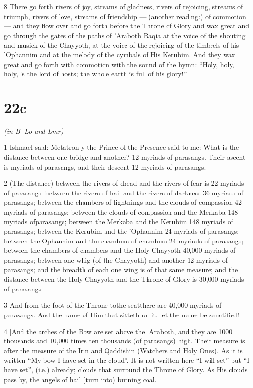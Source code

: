 \par 8 There go forth rivers of joy, streams of gladness, rivers of rejoicing, streams of triumph, rivers of love, streams of friendship — (another reading:) of commotion — and they flow over and go forth before the Throne of Glory and wax great and go through the gates of the paths of 'Araboth Raqia at the voice of the shouting and musick of the Chayyoth, at the voice of the rejoicing of the timbrels of his 'Ophannim and at the melody of the cymbals of His Kerubim. And they wax great and go forth with commotion with the sound of the hymn: “Holy, holy, holy, is the lord of hosts; the whole earth is full of his glory!”

\chapter{22c}

\par \textit{(in B, Lo and Lmr)}

\par 1 Ishmael said: Metatron y the Prince of the Presence said to me: What is the distance between one bridge and another? 12 myriads of parasangs. Their ascent is myriads of parasangs, and their descent 12 myriads of parasangs.

\par 2 (The distance) between the rivers of dread and the rivers of fear is 22 myriads of parasangs; between the rivers of hail and the rivers of darkness 36 myriads of parasangs; between the chambers of lightnings and the clouds of compassion 42 myriads of parasangs; between the clouds of compassion and the Merkaba 148 myriads ofparasangs; between the Merkaba and the Kerubim 148 myriads of parasangs; between the Kerubim and the 'Ophannim 24 myriads of parasangs; between the Ophannim and the chambers of chambers 24 myriads of parasangs; between the chambers of chambers and the Holy Chayyoth 40,000 myriads of parasangs; between one whig (of the Chayyoth) and another 12 myriads of parasangs; and the breadth of each one wing is of that same measure; and the distance between the Holy Chayyoth and the Throne of Glory is 30,000 myriads of parasangs. 

\par 3 And from the foot of the Throne tothe seatthere are 40,000 myriads of parasangs. And the name of Him that sitteth on it: let the name be sanctified! 

\par 4 [And the arches of the Bow are set above the 'Araboth, and they are 1000 thousands and 10,000 times ten thousands (of parasangs) high. Their measure is after the measure of the Irin and Qaddishin (Watchers and Holy Ones). As it is written “My bow I have set in the cloud”. It is not written here “I will set” but “I have set”, (i.e.) already; clouds that surround the Throne of Glory. As His clouds pass by, the angels of hail (turn into) burning coal. 

